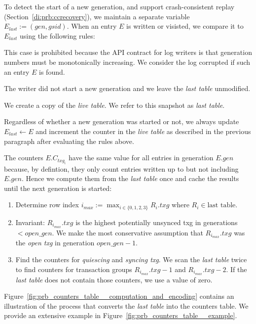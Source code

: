 \documentclass[12pt,a4paper,twoside]{book}
\begin{document}
To detect the start of a new generation, and support crash-consistent replay (Section~\ref{di:prb:ccrecovery}), we maintain a separate variable $E_{last} := (gen, gsid)$.
When an entry $E$ is written or visisted, we compare it to $E_{last}$ using the following rules:
\begin{description}[noitemsep,leftmargin=1.5cm,labelindent=1cm]
\item[$E < E_{last}$] This case is prohibited because the API contract for log writers is that generation numbers must be monotonically increasing.
We consider the log corrupted if such an entry $E$ is found.
\item[$E.gen = E_{last}.gen$] The writer did not start a new generation and we leave the \textit{last table} unmodified.
\item[$E.gen > E_{last}.gen$] We create a copy of the \textit{live table}. We refer to this snapshot as \textit{last table}.
\end{description}
Regardless of whether a new generation was started or not, we always update $E_{last} \leftarrow E$ and increment the counter in the \textit{live table} as described in the previous paragraph after evaluating the rules above.

The counters $E.C_{txg_i}$ have the same value for all entries in generation $E.gen$  because, by defintion, they only count entries written up to but not including $E.gen$.
Hence we compute them from the \textit{last table} once and cache the results until the next generation is started:
\begin{enumerate}[noitemsep]
    \item Determine row index $i_{max} := \max_{i \in \{0,1,2,3\}} R_i.txg$ where $R_i \in \text{last table}$.
    \item Invariant: $R_{i_{max}}.txg$ is the highest potentially unsynced txg in generations $< open\_gen$.
        We make the most conservative assumption that $R_{i_{max}}.txg$ was the \textit{open txg} in generation $open\_gen - 1$.
    \item Find the counters for \textit{quiescing} and \textit{syncing txg}.
        We scan the \textit{last table} twice to find counters for transaction groups $R_{i_{max}}.txg - 1$ and $R_{i_{max}}.txg - 2$.
        If the \textit{last table} does not contain those counters, we use a value of zero.
\end{enumerate}

Figure~\ref{fig:prb_counters_table__computation_and_encoding} contains an illustration of the process that converts the \textit{last table} into the counters table.
We provide an extensive example in Figure~\ref{fig:prb_counters_table__example}.
\end{document}
